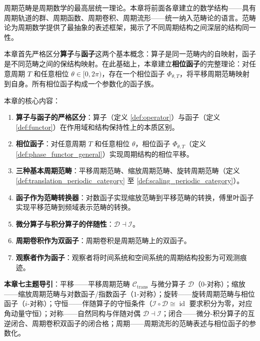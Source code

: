 \begin{remark}[本章定位]\label{rem:periodic_category_chapter_positioning}
周期范畴是周期数学的最高层统一理论。本章将前面各章建立的数学结构——具有周期轨道的群、周期函数、周期卷积、周期流形——统一纳入范畴论的语言。范畴论为周期数学提供了最抽象的表述框架，揭示了不同周期结构之间深层的结构同一性。

本章首先严格区分\textbf{算子}与\textbf{函子}这两个基本概念：算子是同一范畴内的自映射，函子是不同范畴之间的保结构映射。在此基础上，本章建立\textbf{相位函子}的完整理论：对任意周期 $T$ 和任意相位 $\theta \in [0, 2\pi)$，存在一个相位函子 $\Phi_{\theta, T}$，将平移周期范畴映射到自身。所有相位函子构成一个参数化的函子族。

本章的核心内容：
\begin{enumerate}[label=(\arabic*)]
    \item \textbf{算子与函子的严格区分}：算子（定义 \ref{def:operator}）与函子（定义 \ref{def:functor}）在作用域和结构保持性上的本质区别。
    \item \textbf{相位函子}：对任意周期 $T$ 和任意相位 $\theta$，相位函子 $\Phi_{\theta, T}$（定义 \ref{def:phase_functor_general}）实现周期结构的相位平移。
    \item \textbf{三种基本周期范畴}：平移周期范畴、缩放周期范畴、旋转周期范畴（定义 \ref{def:translation_periodic_category} 至 \ref{def:scaling_periodic_category}）。
    \item \textbf{函子作为范畴转换器}：对数函子实现缩放范畴到平移范畴的转换，傅里叶函子实现平移范畴到频域表示范畴的转换。
    \item \textbf{微分算子与积分算子的伴随性}：$\mathcal{D} \dashv \mathcal{I}$。
    \item \textbf{周期卷积作为双函子}：周期卷积是周期范畴上的双函子。
    \item \textbf{观察者作为函子}：观察者将时间系统和空间系统的周期结构投影为可观测痕迹。
\end{enumerate}

\textbf{本章七主题导引}：平移——平移周期范畴 $\mathcal{C}_{\text{trans}}$ 与微分算子 $\mathcal{D}$（$0$-对称）；缩放——缩放周期范畴与对数函子/指数函子（$1$-对称）；旋转——旋转周期范畴与相位函子（$i$-对称）；守恒——伴随算子的守恒条件（$\mathcal{I}\circ\mathcal{D}\cong\operatorname{id}$ 要求积分为零，对应角动量守恒）；对称——自然同构与伴随对偶 $\mathcal{D}\dashv\mathcal{I}$；闭合——微分-积分算子的互逆闭合、周期卷积双函子的闭合格；周期——周期流形的范畴表述与相位函子的参数化。
\end{remark}

